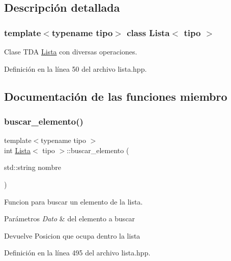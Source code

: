 \subsection{Descripción detallada}
\subsubsection*{template$<$typename tipo$>$\newline
class Lista$<$ tipo $>$}

Clase T\+DA \hyperlink{classLista}{Lista} con diversas operaciones. 

Definición en la línea 50 del archivo lista.\+hpp.



\subsection{Documentación de las funciones miembro}
\mbox{\label{classLista_a18cad7f9b4ae2e76a3083e8e25246588}} 
\subsubsection{\texorpdfstring{buscar\+\_\+elemento()}{buscar\_elemento()}}
{\footnotesize\ttfamily template$<$typename tipo $>$ \\
int \hyperlink{classLista}{Lista}$<$ tipo $>$\+::buscar\+\_\+elemento (\begin{DoxyParamCaption}\item[{std\+::string}]{nombre }\end{DoxyParamCaption})}



Funcion para buscar un elemento de la lista. 


\begin{DoxyParams}{Parámetros}
{\em Dato} & del elemento a buscar \\
\hline
\end{DoxyParams}
\begin{DoxyReturn}{Devuelve}
Posicion que ocupa dentro la lista 
\end{DoxyReturn}


Definición en la línea 495 del archivo lista.\+hpp.

\mbox{\label{classLista_a63f1a416d1bc0eb65b708f99cff25677}} 
